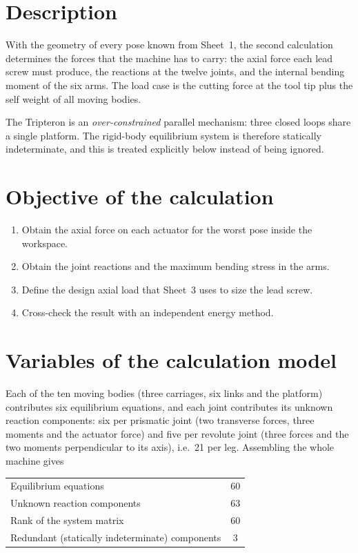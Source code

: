 \documentclass[11pt]{article}
\begin{document}
\section{Description}\label{sec:sta-desc}

With the geometry of every pose known from Sheet~1, the second calculation determines the
forces that the machine has to carry: the axial force each lead screw must produce, the
reactions at the twelve joints, and the internal bending moment of the six arms. The load
case is the cutting force at the tool tip plus the self weight of all moving bodies.

The Tripteron is an \emph{over-constrained} parallel mechanism: three closed loops share a
single platform. The rigid-body equilibrium system is therefore statically indeterminate,
and this is treated explicitly below instead of being ignored.

\section{Objective of the calculation}\label{sec:sta-obj}

\begin{enumerate}[leftmargin=*,nosep]
  \item Obtain the axial force on each actuator for the worst pose inside the workspace.
  \item Obtain the joint reactions and the maximum bending stress in the arms.
  \item Define the design axial load that Sheet~3 uses to size the lead screw.
  \item Cross-check the result with an independent energy method.
\end{enumerate}

\section{Variables of the calculation model}\label{sec:sta-var}

Each of the ten moving bodies (three carriages, six links and the platform) contributes
six equilibrium equations, and each joint contributes its unknown reaction components:
six per prismatic joint (two transverse forces, three moments and the actuator force) and
five per revolute joint (three forces and the two moments perpendicular to its axis), i.e.\
21 per leg. Assembling the whole machine gives
\begin{center}
\begin{tabular}{@{}lc@{}}
\toprule
Equilibrium equations & 60 \\
Unknown reaction components & 63 \\
Rank of the system matrix & 60 \\
Redundant (statically indeterminate) components & 3 \\
\bottomrule
\end{tabular}
\end{center}
\end{document}
